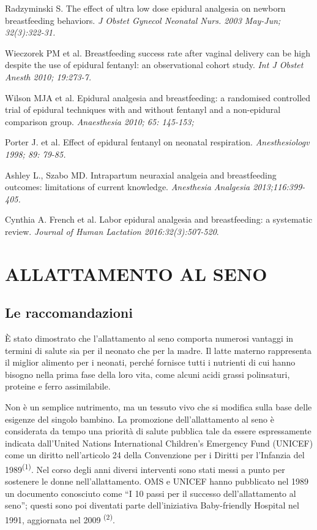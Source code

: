 \documentclass[]{article}
\begin{document}
Radzyminski S. The effect of ultra low dose epidural analgesia on
newborn breastfeeding behaviors. \emph{J Obstet Gynecol Neonatal Nurs.
2003 May-Jun; 32(3):322-31. }

Wieczorek PM et al. Breastfeeding success rate after vaginal delivery
can be high despite the use of epidural fentanyl: an observational
cohort study. \emph{Int J Obstet Anesth 2010; 19:273-7. }

Wilson MJA et al. Epidural analgesia and breastfeeding: a randomised
controlled trial of epidural techniques with and without fentanyl and a
non-epidural comparison group. \emph{Anaesthesia 2010; 65: 145-153;}

Porter J. et al. Effect of epidural fentanyl on neonatal respiration.
\emph{Anesthesiologv 1998; 89: 79-85. }

Ashley L., Szabo MD. Intrapartum neuraxial analgeia and breastfeeding
outcomes: limitations of current knowledge. \emph{Anesthesia Analgesia
2013;116:399-405. }

Cynthia A. French et al. Labor epidural analgesia and breastfeeding: a
systematic review. \emph{Journal of Human Lactation 2016:32(3):507-520}.

\hypertarget{allattamento-al-seno}{%
\section{ALLATTAMENTO AL SENO}\label{allattamento-al-seno}}

\hypertarget{le-raccomandazioni}{%
\subsection{Le raccomandazioni}\label{le-raccomandazioni}}

È stato dimostrato che l'allattamento al seno comporta numerosi vantaggi
in termini di salute sia per il neonato che per la madre. Il latte
materno rappresenta il miglior alimento per i neonati, perché fornisce
tutti i nutrienti di cui hanno bisogno nella prima fase della loro vita,
come alcuni acidi grassi polinsaturi, proteine e ferro assimilabile.

Non è un semplice nutrimento, ma un tessuto vivo che si modifica sulla
base delle esigenze del singolo bambino. La promozione dell'allattamento
al seno è considerata da tempo una priorità di salute pubblica tale da
essere espressamente indicata dall'United Nations International
Children's Emergency Fund (UNICEF) come un diritto nell'articolo 24
della Convenzione per i Diritti per l'Infanzia del
1989\textsuperscript{(1)}. Nel corso degli anni diversi interventi sono
stati messi a punto per sostenere le donne nell'allattamento. OMS e
UNICEF hanno pubblicato nel 1989 un documento conosciuto come ``I 10
passi per il successo dell'allattamento al seno''; questi sono poi
diventati parte dell'iniziativa Baby-friendly Hospital nel 1991,
aggiornata nel 2009 \textsuperscript{(2)}.
\end{document}
